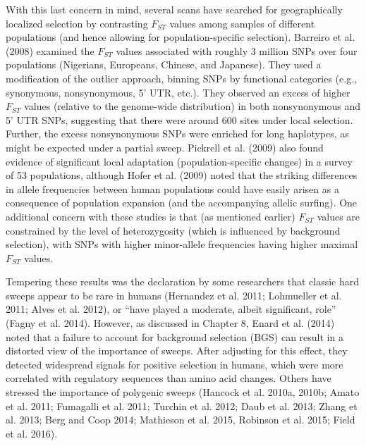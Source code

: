 \documentclass{article}
\begin{document}
With this last concern in mind, several scans have searched for geographically localized selection by contrasting  $ F_{ST} $ values among samples of different populations (and hence allowing for population-specific selection). Barreiro et al. (2008) examined the  $ F_{ST} $ values associated with roughly 3 million SNPs over four populations (Nigerians, Europeans, Chinese, and Japanese). They used a modification of the outlier approach, binning SNPs by functional categories (e.g., synonymous, nonsynonymous, 5' UTR, etc.). They observed an excess of higher  $ F_{ST} $ values (relative to the genome-wide distribution) in both nonsynonymous and 5' UTR SNPs, suggesting that there were around 600 sites under local selection. Further, the excess nonsynonymous SNPs were enriched for long haplotypes, as might be expected under a partial sweep. Pickrell et al. (2009) also found evidence of significant local adaptation (population-specific changes) in a survey of 53 populations, although Hofer et al. (2009) noted that the striking differences in allele frequencies between human populations could have easily arisen as a consequence of population expansion (and the accompanying allelic surfing). One additional concern with these studies is that (as mentioned earlier)  $ F_{ST} $ values are constrained by the level of heterozygosity (which is influenced by background selection), with SNPs with higher minor-allele frequencies having higher maximal  $ F_{ST} $ values.

Tempering these results was the declaration by some researchers that classic hard sweeps appear to be rare in humans (Hernandez et al. 2011; Lohmueller et al. 2011; Alves et al. 2012), or “have played a moderate, albeit significant, role” (Fagny et al. 2014). However, as discussed in Chapter 8, Enard et al. (2014) noted that a failure to account for background selection (BGS) can result in a distorted view of the importance of sweeps. After adjusting for this effect, they detected widespread signals for positive selection in humans, which were more correlated with regulatory sequences than amino acid changes. Others have stressed the importance of polygenic sweeps (Hancock et al. 2010a, 2010b; Amato et al. 2011; Fumagalli et al. 2011; Turchin et al. 2012; Daub et al. 2013; Zhang et al. 2013; Berg and Coop 2014; Mathieson et al. 2015, Robinson et al. 2015; Field et al. 2016).
\end{document}
